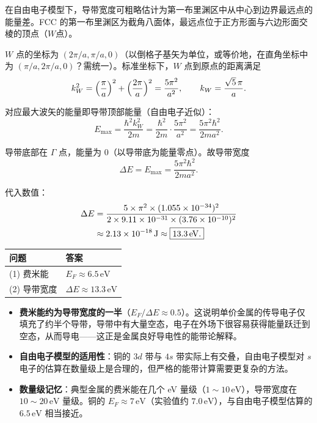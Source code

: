 \begin{derivationbox}[标准解题过程]
在自由电子模型下，导带宽度可粗略估计为第一布里渊区中从中心到边界最远点的能量差。FCC 的第一布里渊区为截角八面体，最远点位于正方形面与六边形面交棱的顶点（$W$点）。

$W$ 点的坐标为 $(2\pi/a,\pi/a,0)$（以倒格子基矢为单位，或等价地，在直角坐标中为 $(\pi/a,2\pi/a,0)$？需统一）。标准坐标下，$W$ 点到原点的距离满足
\begin{equation}
k_W^2 = \Bigl(\frac{\pi}{a}\Bigr)^2 + \Bigl(\frac{2\pi}{a}\Bigr)^2 = \frac{5\pi^2}{a^2},
\qquad
k_W = \frac{\sqrt{5}\,\pi}{a}.
\end{equation}

对应最大波矢的能量即导带顶部能量（自由电子近似）：
\begin{equation}
E_{\max} = \frac{\hbar^2k_W^2}{2m}
= \frac{\hbar^2}{2m}\cdot\frac{5\pi^2}{a^2}
= \frac{5\pi^2\hbar^2}{2ma^2}.
\end{equation}

导带底部在 $\Gamma$ 点，能量为 $0$（以导带底为能量零点）。故导带宽度
\begin{equation}
\Delta E = E_{\max} = \frac{5\pi^2\hbar^2}{2ma^2}.
\end{equation}

代入数值：
\begin{align}
\Delta E &= \frac{5\times\pi^2\times(1.055\times10^{-34})^2}{2\times9.11\times10^{-31}\times(3.76\times10^{-10})^2} \notag\\
&\approx 2.13\times10^{-18}\,\mathrm{J}
\approx \boxed{13.3\,\mathrm{eV}.}
\end{align}
\end{derivationbox}

\begin{formulabox}[答案汇总]
\begin{center}
\begin{tabular}{ll}
\toprule
\textbf{问题} & \textbf{答案} \\
\midrule
(1) 费米能 & $E_F \approx 6.5\,\mathrm{eV}$ \\
(2) 导带宽度 & $\Delta E \approx 13.3\,\mathrm{eV}$ \\
\bottomrule
\end{tabular}
\end{center}
\end{formulabox}

\begin{insightbox}[物理图像与讨论]
\begin{itemize}
    \item \textbf{费米能约为导带宽度的一半}（$E_F/\Delta E\approx 0.5$）。这说明单价金属的传导电子仅填充了约半个导带，导带中有大量空态，电子在外场下很容易获得能量跃迁到空态，从而导电——这正是金属良好导电性的能带论解释。
    \item \textbf{自由电子模型的适用性}：铜的 $3d$ 带与 $4s$ 带实际上有交叠，自由电子模型对 $s$ 电子的估算在数量级上是合理的，但严格的能带计算需要更复杂的方法。
    \item \textbf{数量级记忆}：典型金属的费米能在几个 eV 量级（$1\!\sim\!10\,\mathrm{eV}$），导带宽度在 $10\!\sim\!20\,\mathrm{eV}$ 量级。铜的 $E_F\approx 7\,\mathrm{eV}$（实验值约 $7.0\,\mathrm{eV}$），与自由电子模型估算的 $6.5\,\mathrm{eV}$ 相当接近。
\end{itemize}
\end{insightbox}

